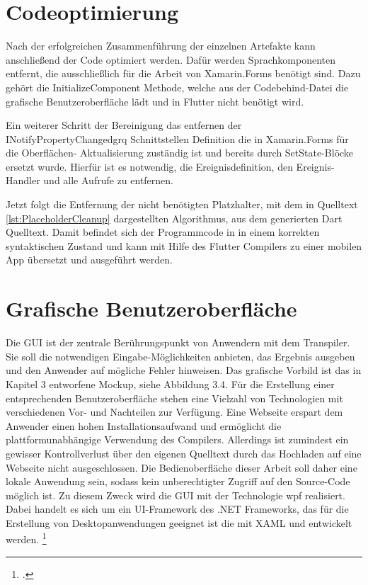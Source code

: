 \section{Codeoptimierung}

Nach der erfolgreichen Zusammenführung der einzelnen Artefakte kann anschließend der Code optimiert werden.  Dafür werden Sprachkomponenten entfernt,  die ausschließlich für die Arbeit von Xamarin.Forms benötigt sind.  Dazu gehört die \glq InitializeComponent\grq{} Methode,  welche aus der Codebehind-Datei die grafische Benutzeroberfläche lädt und in Flutter nicht benötigt wird.  

Ein weiterer Schritt der Bereinigung das entfernen der \glq INotifyPropertyChangedgrq{} Schnittstellen Definition die in Xamarin.Forms für die Oberflächen- Aktualisierung zuständig ist und bereits durch SetState-Blöcke ersetzt wurde.  Hierfür ist es notwendig,  die Ereignisdefinition, den Ereignis-Handler und alle Aufrufe zu entfernen.

Jetzt folgt die Entfernung der nicht benötigten Platzhalter,  mit dem in Quelltext \ref{lst:PlaceholderCleanup} dargestellten Algorithmus,  aus dem generierten Dart Quelltext.  Damit befindet sich der Programmcode in in einem korrekten syntaktischen Zustand und kann mit Hilfe des Flutter Compilers zu einer mobilen App übersetzt und ausgeführt werden. 
\newpage



\section{Grafische Benutzeroberfläche}
Die GUI ist der zentrale Berührungspunkt von Anwendern mit dem Transpiler.  Sie soll die notwendigen Eingabe-Möglichkeiten anbieten, das Ergebnis ausgeben und den Anwender auf mögliche Fehler hinweisen.  Das grafische Vorbild ist das in Kapitel 3 entworfene Mockup, siehe Abbildung 3.4.  Für die Erstellung einer entsprechenden Benutzeroberfläche stehen eine Vielzahl von Technologien mit verschiedenen Vor- und Nachteilen zur Verfügung. Eine Webseite erspart dem Anwender einen hohen Installationsaufwand und ermöglicht die plattformunabhängige Verwendung des Compilers.  Allerdings ist zumindest ein gewisser Kontrollverlust über den eigenen Quelltext durch das  Hochladen auf eine Webseite nicht ausgeschlossen.  Die Bedienoberfläche dieser Arbeit soll daher eine lokale Anwendung sein, sodass kein  unberechtigter Zugriff auf den Source-Code möglich ist.  Zu diesem Zweck wird die GUI mit der Technologie \ac{wpf} realisiert.  Dabei handelt es sich um ein UI-Framework des .NET Frameworks, das für die Erstellung von Desktopanwendungen geeignet ist die mit XAML und \Csharp entwickelt werden. \footcite[Vgl.][S. 1f]{Wenger2012} 

